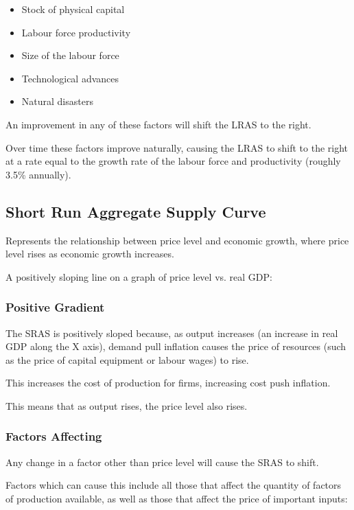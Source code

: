 \documentclass[a4paper,11pt]{article}
\begin{document}
\begin{itemize}
\item Stock of physical capital
\item Labour force productivity
\item Size of the labour force
\item Technological advances
\item Natural disasters
\end{itemize}

An improvement in any of these factors will shift the LRAS to the right.

Over time these factors improve naturally, causing the LRAS to shift to the
right at a rate equal to the growth rate of the labour force and productivity
(roughly 3.5\% annually).


\subsection{Short Run Aggregate Supply Curve}

Represents the relationship between price level and economic growth, where
price level rises as economic growth increases.

A positively sloping line on a graph of price level vs. real GDP:



\subsubsection{Positive Gradient}

The SRAS is positively sloped because, as output increases (an increase in real
GDP along the X axis), demand pull inflation causes the price of resources
(such as the price of capital equipment or labour wages) to rise.

This increases the cost of production for firms, increasing cost push inflation.

This means that as output rises, the price level also rises.


\subsubsection{Factors Affecting}

Any change in a factor other than price level will cause the SRAS to shift.

Factors which can cause this include all those that affect the quantity of
factors of production available, as well as those that affect the price of
important inputs:
\end{document}
